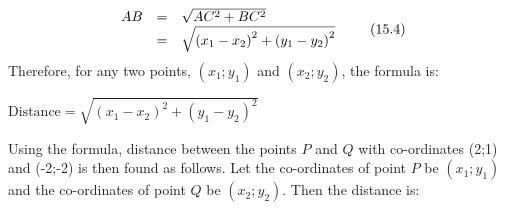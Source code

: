     \begin{equation}
    \begin{array}{ccc}\hfill AB& =& \sqrt{A{C}^{2}+B{C}^{2}}\hfill \\ & =& \sqrt{{\left({x}_{1}-{x}_{2}\right)}^{2}+{\left({y}_{1}-{y}_{2}\right)}^{2}}\hfill \end{array}\tag{15.4}
      \end{equation}
        \label{m39107*id67499}Therefore, for any two points, $\left({x}_{1};{y}_{1}\right)$ and $\left({x}_{2};{y}_{2}\right)$, the formula is:\par 
        \label{m39107*id67561}$\mathrm{Distance}=\sqrt{{\left({x}_{1}-{x}_{2}\right)}^{2}+{\left({y}_{1}-{y}_{2}\right)}^{2}}$\par 
        \label{m39107*id67630}Using the formula, distance between the points $P$ and $Q$ with co-ordinates (2;1) and (-2;-2) is then found as follows. Let the co-ordinates of point $P$ be $\left({x}_{1};{y}_{1}\right)$ and the co-ordinates of point $Q$ be $\left({x}_{2};{y}_{2}\right)$. Then the distance is:\par 
        \label{m39107*id67728}\nopagebreak\noindent{}
          
